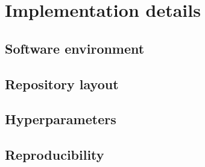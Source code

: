 \chapter{Implementation details}
\label{ch:implementation}


\section{Software environment}

\section{Repository layout}

\section{Hyperparameters}

\section{Reproducibility}

